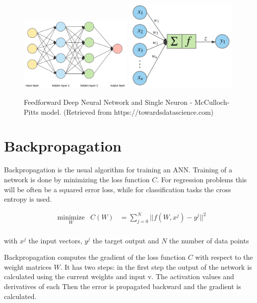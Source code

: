    \begin{figure}[b]
	\centering
	\includegraphics[width=0.49\textwidth]{network}
	\includegraphics[width=0.49\textwidth]{neuron}
	\caption{Feedforward Deep Neural Network and Single Neuron - McCulloch-Pitts model. (Retrieved from https://towardsdatascience.com)}
	\label{neural}
	\end{figure}

\newpage
\section{Backpropagation}
Backpropagation is the usual algorithm for training an ANN. Training of a network is done by minimizing the loss function $C$. For regression problems this will be often be a squared error loss, while for classification tasks the cross entropy is used.

\begin{equation*}
\begin{aligned}
& \underset{W}{\text{minimize}}
& C(W) &= \sum\limits_{j=0}^{N}||f(W,x^j) - y^j||^2 \\
\end{aligned}
\end{equation*}

with $x^j$ the input vectors, $y^j$ the target output and $N$ the number of data points

Backpropagation computes the gradient of the loss function $C$ with respect to the weight matrices $W$. It has two steps: in the first step the output of the network is calculated using the current weights and input v. The activation values and derivatives of each 
Then the error is propagated backward and the gradient is calculated.

